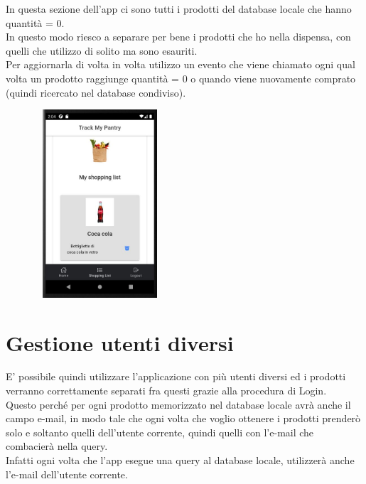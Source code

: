 \documentclass[11pt]{article}
\begin{document}
\begin{multicols}{2}
\begin{flushleft}
In questa sezione dell'app ci sono tutti i prodotti del database locale che hanno quantità = 0.\\
In questo modo riesco a separare per bene i prodotti che ho nella dispensa, con quelli che utilizzo di solito ma sono esauriti.\\
Per aggiornarla di volta in volta utilizzo un evento che viene chiamato ogni qual volta un prodotto raggiunge quantità = 0 o quando viene nuovamente comprato (quindi ricercato nel database condiviso).
\null \vfill
\end{flushleft}

\columnbreak

\begin{flushright}
\includegraphics[width=7cm,height=7cm,keepaspectratio]{ShoppingList}
\null \vfill
\end{flushright}
\end{multicols}
 



\section{Gestione utenti diversi}
E’ possibile quindi utilizzare l’applicazione con più utenti diversi ed i prodotti verranno correttamente separati fra questi grazie alla procedura di Login.\\
Questo perché per ogni prodotto memorizzato nel database locale avrà anche il campo e-mail, in modo tale che ogni volta che voglio ottenere i prodotti prenderò solo e soltanto quelli dell'utente corrente, quindi quelli con l'e-mail che combacierà nella query.\\
Infatti ogni volta che l'app esegue una query al database locale, utilizzerà anche l'e-mail dell'utente corrente.
\end{document}

